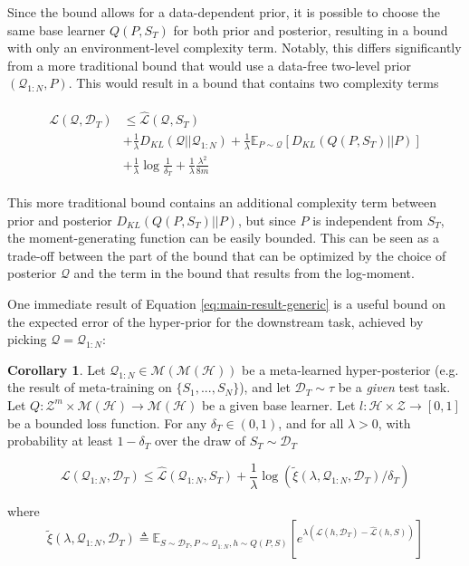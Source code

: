 \documentclass{article}
\theoremstyle{definition}
\newtheorem{corollary}[theorem]{Corollary}
\newcommand{\Expect}[2]{\mathbb{E}_{#1}\left [#2 \right ]}
\begin{document}
Since the bound allows for a data-dependent prior, it is possible to choose the same base learner $Q(P, S_T)$ for both prior and posterior, resulting in a bound with only an environment-level complexity term. 
Notably, this differs significantly from a more traditional bound that would use a data-free two-level prior $(\mathcal{Q}_{1:N}, P)$. This would result in a bound that contains two complexity terms

\begin{align*}
\begin{split}
\mathcal{L}(\mathcal{Q}, \mathcal{D}_T) &\leq \hat{\mathcal{L}}(\mathcal{Q}, S_T) \\
&+ \frac{1}{\lambda}D_{KL}(\mathcal{Q}||\mathcal{Q}_{1:N}) + \frac{1}{\lambda}\Expect{P\sim \mathcal{Q}}{D_{KL}(Q(P,S_T)||P)}\\
&+\frac{1}{\lambda}\log\frac{1}{\delta_T}+\frac{1}{\lambda}\frac{\lambda^2}{8m}
\end{split}
\end{align*}

This more traditional bound contains an additional complexity term between prior and posterior $D_{KL}(Q(P,S_T)||P)$, but since $P$ is independent from $S_T$, the moment-generating function can be easily bounded. This can be seen as a trade-off between the part of the bound that can be optimized by the choice of posterior $\mathcal{Q}$ and the term in the bound that results from the log-moment.

One immediate result of Equation \ref{eq:main-result-generic} is a useful bound on the expected error of the hyper-prior for the downstream task, achieved by picking $\mathcal{Q}=\mathcal{Q}_{1:N}$:

\begin{corollary} \label{thm:corollary-base}
	Let $\mathcal{Q}_{1:N}\in \mathcal{M}(\mathcal{M}(\mathcal{H}))$ be a meta-learned hyper-posterior (e.g. the result of meta-training on $\{S_1,...,S_N\}$), and let $\mathcal{D}_T\sim \tau$ be a \emph{given} test task. Let $Q: \mathcal{Z}^m\times\mathcal{M}(\mathcal{H})\rightarrow \mathcal{M}(\mathcal{H})$ be a given base learner. Let $l: \mathcal{H}\times \mathcal{Z}\rightarrow [0, 1]$ be a bounded loss function.
	For any $\delta_T \in (0,1)$, and for all $\lambda>0$, with probability at least $1-\delta_T$ over the draw of $S_T\sim \mathcal{D}_T$
	
	$$\mathcal{L}(\mathcal{Q}_{1:N}, \mathcal{D}_T) \leq \hat{\mathcal{L}}(\mathcal{Q}_{1:N}, S_T)
	+\frac{1}{\lambda}\log\left (\tilde{\xi}(\lambda,\mathcal{Q}_{1:N},\mathcal{D}_T)/\delta_T\right )$$
	
	where 
	$$\tilde{\xi}(\lambda,\mathcal{Q}_{1:N},\mathcal{D}_T)\triangleq \Expect{S\sim \mathcal{D}_T, P\sim \mathcal{Q}_{1:N}, h\sim Q(P,S)}{e^{\lambda\left (\mathcal{L}(h, \mathcal{D}_T)-\hat{\mathcal{L}}(h, S)\right )}}$$
\end{corollary}
\end{document}
